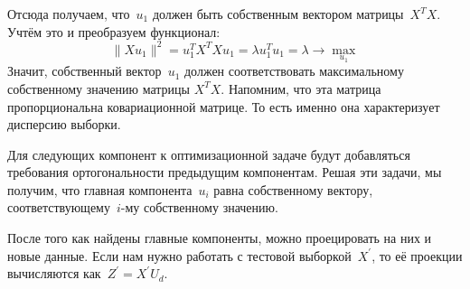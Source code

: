 \documentclass[12pt,fleqn]{article}
\begin{document}
Отсюда получаем, что~$u_1$ должен быть собственным вектором матрицы~$X^T X$.
Учтём это и преобразуем функционал:
\[
    \| X u_1 \|^2
    =
    u_1^T X^T X u_1
    =
    \lambda u_1^T u_1
    =
    \lambda
    \to
    \max_{u_1}
\]
Значит, собственный вектор~$u_1$ должен соответствовать максимальному
собственному значению матрицы $X^TX.$ Напомним, что эта матрица пропорциональна ковариационной матрице. То есть именно она характеризует дисперсию выборки. 

Для следующих компонент к оптимизационной задаче будут добавляться требования
ортогональности предыдущим компонентам.
Решая эти задачи, мы получим, что главная компонента~$u_i$
равна собственному вектору, соответствующему~$i$-му собственному значению.

После того как найдены главные компоненты, можно проецировать на них и новые данные.
Если нам нужно работать с тестовой выборкой~$X^\prime$, то её проекции вычисляются как~$Z^\prime = X^\prime U_d$.
\end{document}

